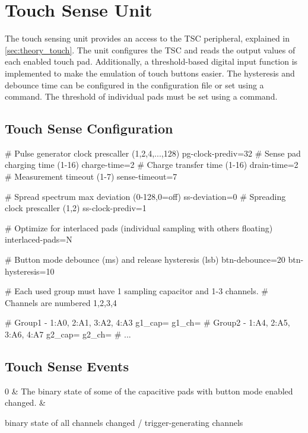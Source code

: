 \section{Touch Sense Unit}

The touch sensing unit provides an access to the \gls{TSC} peripheral, explained in \cref{sec:theory_touch}. The unit configures the \gls{TSC} and reads the output values of each enabled touch pad. Additionally, a threshold-based digital input function is implemented to make the emulation of touch buttons easier. The hysteresis and debounce time can be configured in the configuration file or set using a command. The threshold of individual pads must be set using a command.

\subsection{Touch Sense Configuration}

\begin{inicode}
# Pulse generator clock prescaller (1,2,4,...,128)
pg-clock-prediv=32
# Sense pad charging time (1-16)
charge-time=2
# Charge transfer time (1-16)
drain-time=2
# Measurement timeout (1-7)
sense-timeout=7

# Spread spectrum max deviation (0-128,0=off)
ss-deviation=0
# Spreading clock prescaller (1,2)
ss-clock-prediv=1

# Optimize for interlaced pads (individual sampling with others floating)
interlaced-pads=N

# Button mode debounce (ms) and release hysteresis (lsb)
btn-debounce=20
btn-hysteresis=10

# Each used group must have 1 sampling capacitor and 1-3 channels.
# Channels are numbered 1,2,3,4

# Group1 - 1:A0, 2:A1, 3:A2, 4:A3
g1_cap=
g1_ch=
# Group2 - 1:A4, 2:A5, 3:A6, 4:A7
g2_cap=
g2_ch=
# ...
\end{inicode}


\subsection{Touch Sense Events}

\begin{cmdlist}
    0 & 
    The binary state of some of the capacitive pads with button mode enabled changed.
    & \begin{cmdpld}
         binary state of all channels
         changed / trigger-generating channels
    \end{cmdpld} \\
\end{cmdlist}

